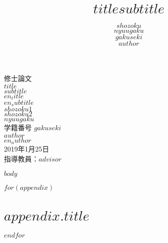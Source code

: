 \documentclass[a4paper,10.5pt]{jsreport}
\title{ \Large $title$\newline{\ddash}$subtitle${\ddash}}
\author{$shozoku$\\$nyuugaku$\\$gakuseki$\\$author$}
\date{}
\begin{document}
\begin{titlepage}

\begin{center}
\vspace*{100truept}
{\Large 修士論文}\\
\vspace{50truept}
{\huge $title$}\\ %
\vspace{10truept}
{\huge $subtitle$}\\ %
\vspace{10truept}
{\large $en_title$}\\ %
{\large $en_subtitle$}\\
\vspace{60truept}
{\Large $shozoku1$}\\
{\Large $shozoku2$}\\
\vspace{20truept}
{\Large $nyuugaku$}\\ %
\vspace{20truept}
{\Large 学籍番号 $gakuseki$}\\
\vspace{20truept}
{\Large $author$}\\ %
{\Large $en_author$}\\ %
\vspace{10truept}
{\Large 2019年1月25日}\\ %
\vspace{20truept}
{\large
指導教員：$advisor$\\
}
\end{center}

\end{titlepage}

\tableofcontents

$body$

\printbibliography[title = 参考文献]


\appendix

$for(appendix)$
\chapter{$appendix.title$}

$endfor$
\end{document}
